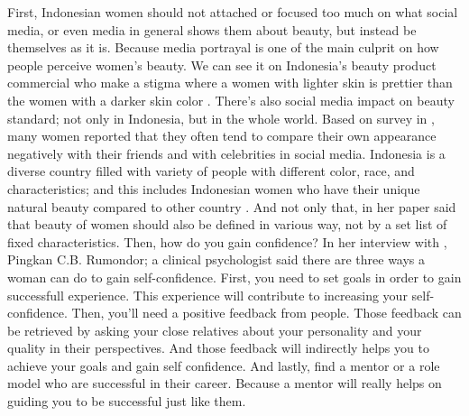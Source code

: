 \documentclass[12pt]{article}
\begin{document}
    First, Indonesian women should not attached or focused too much on what social
    media, or even media in general shows them about beauty, but instead be themselves
    as it is. Because media portrayal is one of the main culprit on how people 
    perceive women's beauty. We can see it on Indonesia's beauty product
    commercial who make a stigma where a women with lighter skin is prettier than
    the women with a darker skin color \parencite{prianti2013indonesian}. There's also social media impact on
    beauty standard; not only in Indonesia, but in the whole world. Based on 
    \citeauthor{fardoulyNegativeComparisonsOne2015} survey in \citeyear{fardoulyNegativeComparisonsOne2015},
    many women reported that they often tend to compare their own appearance
    negatively with their friends and with celebrities in social media. 
    Indonesia is a diverse country filled with variety of people with different
    color, race, and characteristics; and this includes Indonesian women who have
    their unique natural beauty compared to other country \parencite{wirasariKAJIANKECANTIKANKAUM2016}.
    And not only that, \citeauthor{prianti2013indonesian} in her paper said that 
    beauty of women should also be defined in various way, not by a set list
    of fixed characteristics.
    Then, how do you gain confidence? In her interview with
    \citeauthor{kumparanwomanBagaimanaCaraMeningkatkan2019}, Pingkan C.B. Rumondor;
    a clinical psychologist said there are three ways a woman can do to gain self-confidence.
    First, you need to set goals in order to gain successfull experience. This 
    experience will contribute to increasing your self-confidence. Then, you'll 
    need a positive feedback from people. Those feedback can be retrieved by asking
    your close relatives about your personality and your quality in their perspectives.
    And those feedback will indirectly helps you to achieve your goals and gain
    self confidence. And lastly, find a mentor or a role model who are successful
    in their career. Because a mentor will really helps on guiding you to be 
    successful just like them.
\end{document}
